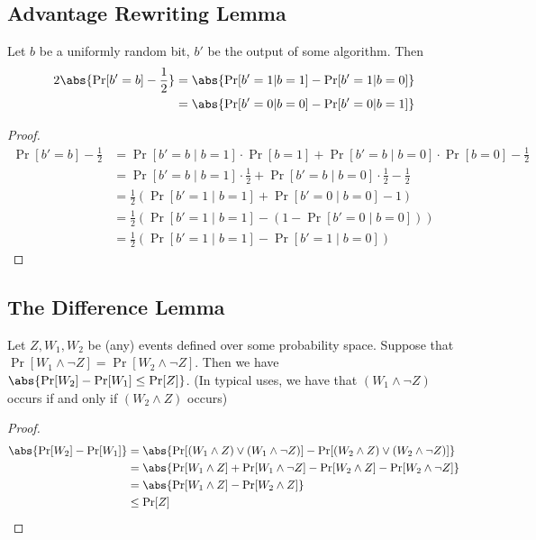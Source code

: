 \subsection{Advantage Rewriting Lemma}
Let $b$ be a uniformly random bit, $b'$ be the output of some algorithm. Then 
$$
\begin{aligned}
2 \abs{\Pr[b' = b] - \frac{1}{2}} 
&= \abs{\Pr[b' = 1 | b = 1] - \Pr[b' = 1 | b = 0] } \\
&= \abs{\Pr[b' = 0 | b = 0] - \Pr[b' = 0 | b = 1] }
\end{aligned}
$$

\begin{proof}
$$
\begin{aligned}
\Pr[b'=b] - \frac{1}{2} &= \Pr[b' = b \mid b = 1] \cdot \Pr[b=1] + \Pr[b'=b \mid b = 0] \cdot \Pr[b = 0] - \frac{1}{2} \\	
&=  \Pr[b' = b \mid b = 1] \cdot \frac{1}{2} + \Pr[b' = b \mid b = 0] \cdot \frac{1}{2} - \frac{1}{2} \\  
&= \frac{1}{2}(\Pr[b'=1 \mid b = 1] + \Pr[b' = 0 \mid b=0] - 1) \\
&= \frac{1}{2}(\Pr[b'=1 \mid b = 1] - (1 - \Pr[b' = 0 \mid b = 0])) \\
&= \frac{1}{2}(\Pr[b'=1 \mid b=1] - \Pr[b'=1 \mid b = 0])
\end{aligned}
$$

\end{proof}



\subsection{The Difference Lemma}
Let $Z, W_1, W_2$ be (any) events defined over some probability space. Suppose that $\Pr[W_1 \wedge \neg Z] = \Pr[W_2 \wedge \neg Z]$. Then we have $\abs{\Pr[W_2] - \Pr[W_1] \leq \Pr[Z]}$. (In typical uses, we have that $(W_1 \wedge \neg Z)$ occurs if and only if $(W_2 \wedge Z)$ occurs)

\begin{proof}
$$
\begin{aligned}
\abs{\Pr[W_2] - \Pr[W_1]} &= \abs{\Pr[(W_1 \wedge Z) \vee (W_1 \wedge \neg Z)]  -\Pr[(W_2 \wedge Z) \vee (W_2 \wedge \neg Z)] } \\ 
&= \abs{\Pr[W_1 \wedge Z] + \Pr[W_1 \wedge \neg Z]  - \Pr[W_2 \wedge Z] - \Pr[W_2 \wedge \neg Z] } \\ 
&= \abs{\Pr[W_1 \wedge Z] - \Pr[W_2 \wedge Z]} \\
&\leq \Pr[Z]
\end{aligned}
$$
\end{proof}